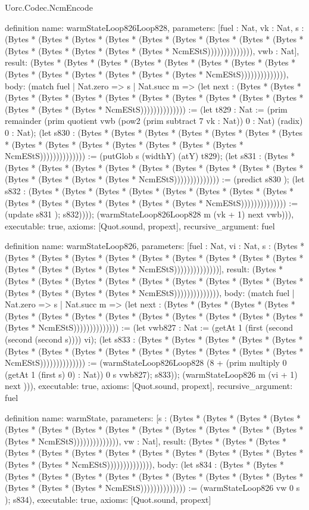 \begin{lexlean}{Uorc.Codec.NcmEncode}
\begin{semanticmodule}
definition{
  name: warmStateLoop826Loop828,
  parameters: [fuel : Nat, vk : Nat, s : (Bytes * (Bytes * (Bytes * (Bytes * (Bytes * (Bytes * (Bytes * (Bytes * (Bytes * (Bytes * (Bytes * (Bytes * (Bytes * (Bytes * NcmEStS)))))))))))))), vwb : Nat],
  result: (Bytes * (Bytes * (Bytes * (Bytes * (Bytes * (Bytes * (Bytes * (Bytes * (Bytes * (Bytes * (Bytes * (Bytes * (Bytes * (Bytes * NcmEStS)))))))))))))),
  body: (match fuel
    | Nat.zero => s
    | Nat.succ m => (let next : (Bytes * (Bytes * (Bytes * (Bytes * (Bytes * (Bytes * (Bytes * (Bytes * (Bytes * (Bytes * (Bytes * (Bytes * (Bytes * (Bytes * NcmEStS)))))))))))))) := (let t829 : Nat := (prim remainder (prim quotient vwb (pow2 (prim subtract 7 vk : Nat)) 0 : Nat) (radix) 0 : Nat); (let s830 : (Bytes * (Bytes * (Bytes * (Bytes * (Bytes * (Bytes * (Bytes * (Bytes * (Bytes * (Bytes * (Bytes * (Bytes * (Bytes * (Bytes * NcmEStS)))))))))))))) := (putGlob s (widthY) (atY) t829); (let s831 : (Bytes * (Bytes * (Bytes * (Bytes * (Bytes * (Bytes * (Bytes * (Bytes * (Bytes * (Bytes * (Bytes * (Bytes * (Bytes * (Bytes * NcmEStS)))))))))))))) := (predict s830 ); (let s832 : (Bytes * (Bytes * (Bytes * (Bytes * (Bytes * (Bytes * (Bytes * (Bytes * (Bytes * (Bytes * (Bytes * (Bytes * (Bytes * (Bytes * NcmEStS)))))))))))))) := (update s831 ); s832)))); (warmStateLoop826Loop828 m (vk + 1) next vwb))),
  executable: true,
  axioms: [Quot.sound, propext],
  recursive_argument: fuel
}

definition{
  name: warmStateLoop826,
  parameters: [fuel : Nat, vi : Nat, s : (Bytes * (Bytes * (Bytes * (Bytes * (Bytes * (Bytes * (Bytes * (Bytes * (Bytes * (Bytes * (Bytes * (Bytes * (Bytes * (Bytes * NcmEStS))))))))))))))],
  result: (Bytes * (Bytes * (Bytes * (Bytes * (Bytes * (Bytes * (Bytes * (Bytes * (Bytes * (Bytes * (Bytes * (Bytes * (Bytes * (Bytes * NcmEStS)))))))))))))),
  body: (match fuel
    | Nat.zero => s
    | Nat.succ m => (let next : (Bytes * (Bytes * (Bytes * (Bytes * (Bytes * (Bytes * (Bytes * (Bytes * (Bytes * (Bytes * (Bytes * (Bytes * (Bytes * (Bytes * NcmEStS)))))))))))))) := (let vwb827 : Nat := (getAt 1 (first (second (second (second s)))) vi); (let s833 : (Bytes * (Bytes * (Bytes * (Bytes * (Bytes * (Bytes * (Bytes * (Bytes * (Bytes * (Bytes * (Bytes * (Bytes * (Bytes * (Bytes * NcmEStS)))))))))))))) := (warmStateLoop826Loop828 (8 + (prim multiply 0 (getAt 1 (first s) 0) : Nat)) 0 s vwb827); s833)); (warmStateLoop826 m (vi + 1) next ))),
  executable: true,
  axioms: [Quot.sound, propext],
  recursive_argument: fuel
}

definition{
  name: warmState,
  parameters: [s : (Bytes * (Bytes * (Bytes * (Bytes * (Bytes * (Bytes * (Bytes * (Bytes * (Bytes * (Bytes * (Bytes * (Bytes * (Bytes * (Bytes * NcmEStS)))))))))))))), vw : Nat],
  result: (Bytes * (Bytes * (Bytes * (Bytes * (Bytes * (Bytes * (Bytes * (Bytes * (Bytes * (Bytes * (Bytes * (Bytes * (Bytes * (Bytes * NcmEStS)))))))))))))),
  body: (let s834 : (Bytes * (Bytes * (Bytes * (Bytes * (Bytes * (Bytes * (Bytes * (Bytes * (Bytes * (Bytes * (Bytes * (Bytes * (Bytes * (Bytes * NcmEStS)))))))))))))) := (warmStateLoop826 vw 0 s ); s834),
  executable: true,
  axioms: [Quot.sound, propext]
}


\end{semanticmodule}
\end{lexlean}
